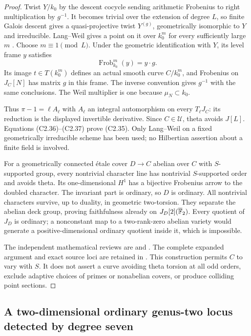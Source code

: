 \begin{proof}
Twist $Y/k_0$ by the descent cocycle sending arithmetic
Frobenius to right multiplication by $g^{-1}$.
It becomes trivial over the extension of degree $L$,
so finite Galois descent gives a quasi-projective twist
$Y^{(g)}$, geometrically isomorphic to $Y$ and irreducible.
Lang--Weil gives a point on it over $k_0^m$ for every
sufficiently large $m$
\citep[Theorem 7.7.1(ii)--(iii)]{A_Poonen2017}.
Choose $m\equiv1\pmod L$. Under the geometric identification
with $Y$, its level frame $y$ satisfies
\[
                    \operatorname{Frob}_{k_0}^m(y)=y\cdot g .
\]
Its image $t\in T(k_0^m)$ defines an actual smooth curve
$C/k_0^m$, and Frobenius on $J_C[N]$ has matrix $g$
in this frame. The inverse convention gives $g^{-1}$
with the same conclusions. The Weil multiplier is one
because $\mu_N\subset k_0$.

Thus $\pi-1=\ell A_\ell$ with $A_\ell$ an integral
automorphism on every $T_\ell J_C$: its reduction is the
displayed invertible derivative. Since $C\in\mathcal U$,
theta avoids $J[L]$. Equations (C2.36)--(C2.37) prove
(C2.35). Only Lang--Weil on a fixed geometrically irreducible
scheme has been used; no Hilbertian assertion about
a finite field is involved.

For a geometrically connected \'etale cover $D\to C$
abelian over $C$ with $S$-supported group, every nontrivial
character line has nontrivial $S$-supported order and avoids
theta. Its one-dimensional $H^1$ has a bijective Frobenius
arrow to the doubled character. The invariant part is
ordinary, so $D$ is ordinary. All nontrivial characters
survive, up to duality, in geometric two-torsion.
They separate the abelian deck group, proving faithfulness
already on $J_D[2](\overline{\mathbb F}_2)$.
Every quotient of $J_D$ is ordinary; a nonconstant map to
a two-rank-zero abelian variety would generate a
positive-dimensional ordinary quotient inside it,
which is impossible.

The independent mathematical reviews are
 and
.
The complete expanded argument and exact source loci are
retained in .
This construction permits $C$ to vary with $S$. It does
not assert a curve avoiding theta torsion at all odd
orders, exclude adaptive choices of primes or nonabelian
covers, or produce colliding point sections.
\end{proof}

\subsection{A two-dimensional ordinary genus-two locus detected by degree seven}

